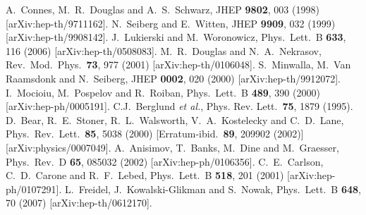 \documentclass[prl,tightenlines]{revtex4}
\begin{document}
\begin{thebibliography}{99}
  A.~Connes, M.~R.~Douglas and A.~S.~Schwarz,
  JHEP {\bf 9802}, 003 (1998)
  [arXiv:hep-th/9711162].
  N.~Seiberg and E.~Witten,
  JHEP {\bf 9909}, 032 (1999)
  [arXiv:hep-th/9908142].
  J.~Lukierski and M.~Woronowicz,
  Phys.\ Lett.\  B {\bf 633}, 116 (2006)
  [arXiv:hep-th/0508083].
  M.~R.~Douglas and N.~A.~Nekrasov,
  Rev.\ Mod.\ Phys.\  {\bf 73}, 977 (2001)
  [arXiv:hep-th/0106048].
  S.~Minwalla, M.~Van Raamsdonk and N.~Seiberg,
  JHEP {\bf 0002}, 020 (2000)
  [arXiv:hep-th/9912072].
  I.~Mocioiu, M.~Pospelov and R.~Roiban,
  Phys.\ Lett.\  B {\bf 489}, 390 (2000)
  [arXiv:hep-ph/0005191].
  C.J.~Berglund {\it et al.}, 
  Phys. Rev. Lett.\ {\bf 75}, 1879 (1995).
  D.~Bear, R.~E.~Stoner, R.~L.~Walsworth, V.~A.~Kostelecky and C.~D.~Lane,
  Phys.\ Rev.\ Lett.\  {\bf 85}, 5038 (2000)
  [Erratum-ibid.\  {\bf 89}, 209902 (2002)]
  [arXiv:physics/0007049].
  A.~Anisimov, T.~Banks, M.~Dine and M.~Graesser,
  Phys.\ Rev.\  D {\bf 65}, 085032 (2002)
  [arXiv:hep-ph/0106356].
  C.~E.~Carlson, C.~D.~Carone and R.~F.~Lebed,
  Phys.\ Lett.\  B {\bf 518}, 201 (2001)
  [arXiv:hep-ph/0107291].
  L.~Freidel, J.~Kowalski-Glikman and S.~Nowak,
  Phys.\ Lett.\  B {\bf 648}, 70 (2007)
  [arXiv:hep-th/0612170].
  

\end{thebibliography}
\end{document}
